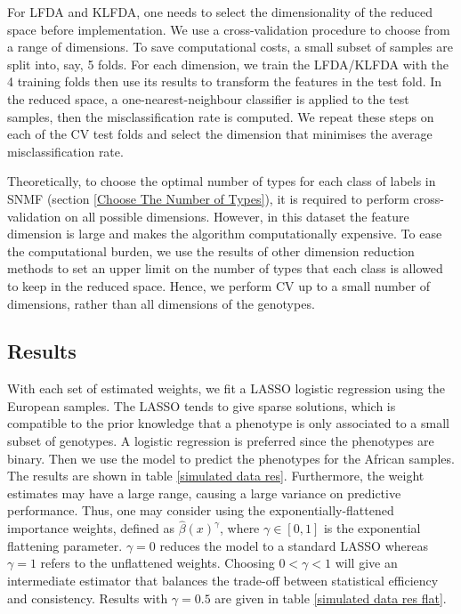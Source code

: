\documentclass[a4paper,12pt]{article}
\begin{document}
For LFDA and KLFDA, one needs to select the dimensionality of the reduced space before implementation. We use a cross-validation procedure to choose from a range of dimensions. To save computational costs, a small subset of samples are split into, say, 5 folds. For each dimension, we train the LFDA/KLFDA with the 4 training folds then use its results to transform the features in the test fold. In the reduced space, a one-nearest-neighbour classifier is applied to the test samples, then the misclassification rate is computed. We repeat these steps on each of the CV test folds and select the dimension that minimises the average misclassification rate.

Theoretically, to choose the optimal number of types for each class of labels in SNMF (section \ref{Choose The Number of Types}), it is required to perform cross-validation on all possible dimensions. However, in this dataset the feature dimension is large and makes the algorithm computationally expensive. To ease the computational burden, we use the results of other dimension reduction methods to set an upper limit on the number of types that each class is allowed to keep in the reduced space. Hence, we perform CV up to a small number of dimensions, rather than all dimensions of the genotypes.

\subsection{Results}
With each set of estimated weights, we fit a LASSO logistic regression using the European samples. The LASSO tends to give sparse solutions, which is compatible to the prior knowledge that a phenotype is only associated to a small subset of genotypes. A logistic regression is preferred since the phenotypes are binary. Then we use the model to predict the phenotypes for the African samples. The results are shown in table \ref{simulated data res}. Furthermore, the weight estimates may have a large range, causing a large variance on predictive performance. Thus, one may consider using the exponentially-flattened importance weights, defined as $\hat{\beta}(x)^{\gamma}$, where $\gamma \in [0,1]$ is the exponential flattening parameter. $\gamma = 0$ reduces the model to a standard LASSO whereas $\gamma = 1$ refers to the unflattened weights. Choosing $0 < \gamma < 1 $ will give an intermediate estimator that balances the trade-off between statistical efficiency and consistency. Results with $\gamma = 0.5$ are given in table \ref{simulated data res flat}.
\end{document}
